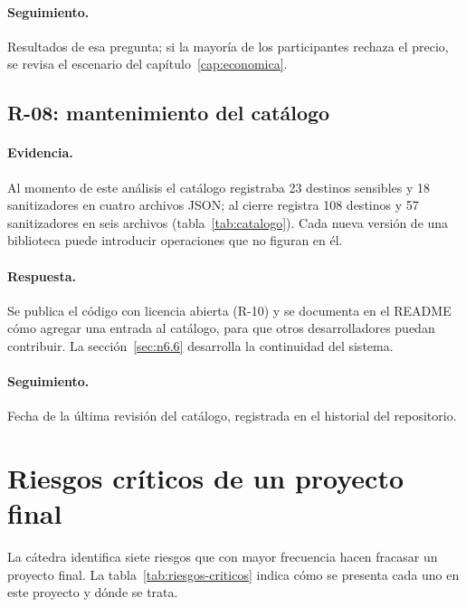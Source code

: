 \paragraph{Seguimiento.} Resultados de esa pregunta; si la mayoría de los participantes rechaza el precio, se revisa el escenario del capítulo~\ref{cap:economica}.

\subsection{R-08: mantenimiento del catálogo}\label{sec:n6.4.8}

\paragraph{Evidencia.} Al momento de este análisis el catálogo registraba 23 destinos sensibles y 18 sanitizadores en cuatro archivos JSON; al cierre registra 108 destinos y 57 sanitizadores en seis archivos (tabla~\ref{tab:catalogo}). Cada nueva versión de una biblioteca puede introducir operaciones que no figuran en él.

\paragraph{Respuesta.} Se publica el código con licencia abierta (R-10) y se documenta en el README cómo agregar una entrada al catálogo, para que otros desarrolladores puedan contribuir. La sección~\ref{sec:n6.6} desarrolla la continuidad del sistema.

\paragraph{Seguimiento.} Fecha de la última revisión del catálogo, registrada en el historial del repositorio.

\section{Riesgos críticos de un proyecto final}\label{sec:n6.5}

La cátedra identifica siete riesgos que con mayor frecuencia hacen fracasar un proyecto final. La tabla~\ref{tab:riesgos-criticos} indica cómo se presenta cada uno en este proyecto y dónde se trata.

